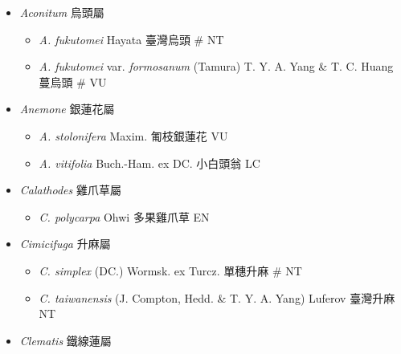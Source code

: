 
  \begin{itemize}
 \item[] \textit{Aconitum} 烏頭屬
                                
  \begin{itemize}
        \item[] \textit{A. fukutomei} Hayata  臺灣烏頭  \# NT
        \item[] \textit{A. fukutomei} var. \textit{formosanum} (Tamura) T. Y. A. Yang \& T. C. Huang  蔓烏頭  \# VU
  \end{itemize}
 \item[] \textit{Anemone} 銀蓮花屬
                                
  \begin{itemize}
        \item[] \textit{A. stolonifera} Maxim.  匍枝銀蓮花   VU
        \item[] \textit{A. vitifolia} Buch.-Ham. ex DC.  小白頭翁   LC
  \end{itemize}
 \item[] \textit{Calathodes} 雞爪草屬
                                
  \begin{itemize}
        \item[] \textit{C. polycarpa} Ohwi  多果雞爪草   EN
  \end{itemize}
 \item[] \textit{Cimicifuga} 升麻屬
                                
  \begin{itemize}
        \item[] \textit{C. simplex} (DC.) Wormsk. ex Turcz.  單穗升麻  \# NT
        \item[] \textit{C. taiwanensis} (J. Compton, Hedd. \& T. Y. A. Yang) Luferov  臺灣升麻   NT
  \end{itemize}
 \item[] \textit{Clematis} 鐵線蓮屬
                                

\end{itemize}
